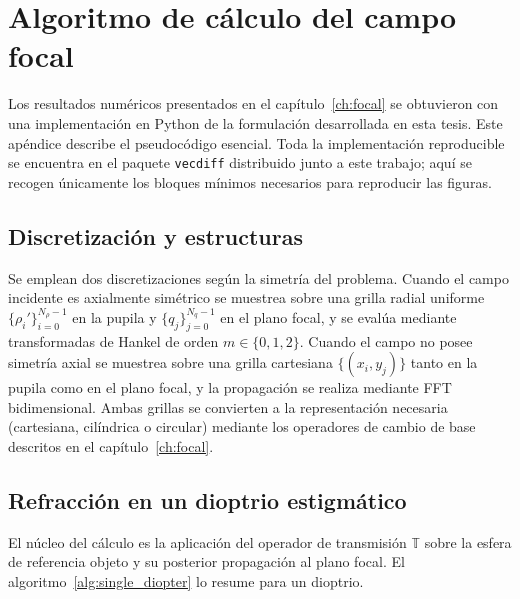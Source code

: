 \chapter{Algoritmo de cálculo del campo focal}
\label{apx:numerical_algorithm}

Los resultados numéricos presentados en el capítulo~\ref{ch:focal} se
obtuvieron con una implementación en Python de la formulación desarrollada en
esta tesis. Este apéndice describe el pseudocódigo esencial. Toda la
implementación reproducible se encuentra en el paquete \texttt{vecdiff}
distribuido junto a este trabajo; aquí se recogen únicamente los bloques
mínimos necesarios para reproducir las figuras.

\section{Discretización y estructuras}

Se emplean dos discretizaciones según la simetría del problema. Cuando el
campo incidente es axialmente simétrico se muestrea sobre una grilla radial
uniforme $\{\rho_i'\}_{i=0}^{N_\rho-1}$ en la pupila y $\{q_j\}_{j=0}^{N_q-1}$
en el plano focal, y se evalúa mediante transformadas de Hankel de orden
$m\in\{0,1,2\}$. Cuando el campo no posee simetría axial se muestrea sobre
una grilla cartesiana $\{(x_i,y_j)\}$ tanto en la pupila como en el plano
focal, y la propagación se realiza mediante FFT bidimensional. Ambas grillas
se convierten a la representación necesaria (cartesiana, cilíndrica o
circular) mediante los operadores de cambio de base descritos en el
capítulo~\ref{ch:focal}.

\section{Refracción en un dioptrio estigmático}

El núcleo del cálculo es la aplicación del operador de transmisión
$\mathbb T$ sobre la esfera de referencia objeto y su posterior propagación
al plano focal. El algoritmo~\ref{alg:single_diopter} lo resume para un
dioptrio.

